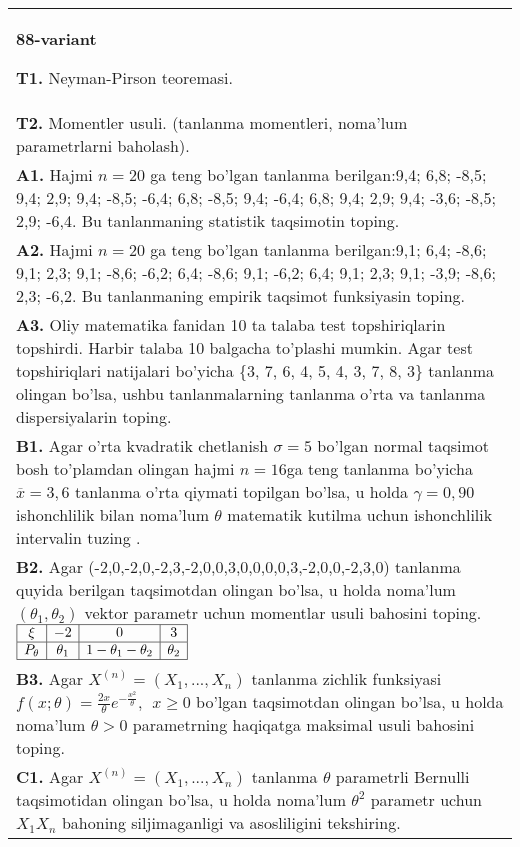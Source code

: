 \documentclass{article}
\begin{document}
\begin{tabular}{m{17cm}}
\textbf{88-variant}
\newline

\textbf{T1.} 
Neyman-Pirson teoremasi.
\\
\textbf{T2.} 
Momentler usuli. (tanlanma momentleri, noma'lum parametrlarni baholash).
\\
\textbf{A1.} 
Hajmi \(n = 20\) ga teng bo'lgan tanlanma berilgan:9,4; 6,8; -8,5; 9,4; 2,9; 9,4; -8,5; -6,4; 6,8; -8,5; 9,4; -6,4; 6,8; 9,4; 2,9; 9,4; -3,6; -8,5; 2,9; -6,4. Bu tanlanmaning statistik taqsimotin toping.
\\
\textbf{A2.} 
Hajmi \(n = 20\) ga teng bo'lgan tanlanma berilgan:9,1; 6,4; -8,6; 9,1; 2,3; 9,1; -8,6; -6,2; 6,4; -8,6; 9,1; -6,2; 6,4; 9,1; 2,3; 9,1; -3,9; -8,6; 2,3; -6,2. Bu tanlanmaning empirik taqsimot funksiyasin toping.
\\
\textbf{A3.} 
Oliy matematika fanidan 10 ta talaba test topshiriqlarin topshirdi. Harbir talaba 10 balgacha to'plashi mumkin. Agar test topshiriqlari natijalari bo'yicha \{3, 7, 6, 4, 5, 4, 3, 7, 8, 3\} tanlanma olingan bo'lsa, ushbu tanlanmalarning tanlanma o'rta va tanlanma dispersiyalarin toping.
\\
\textbf{B1.} 
Agar o'rta kvadratik chetlanish \(\sigma = 5\) bo'lgan normal taqsimot bosh to'plamdan olingan hajmi \(n = 16\)ga teng tanlanma bo'yicha \(\overline{x} = 3,6\) tanlanma o'rta qiymati topilgan bo'lsa, u holda \(\gamma = 0,90\) ishonchlilik bilan noma'lum \(\theta\) matematik kutilma uchun ishonchlilik intervalin tuzing .
\\
\textbf{B2.} 
Agar (-2,0,-2,0,-2,3,-2,0,0,3,0,0,0,0,3,-2,0,0,-2,3,0) tanlanma quyida berilgan taqsimotdan olingan bo'lsa, u holda noma'lum \(\left( \theta_{1},\theta_{2} \right)\) vektor parametr uchun momentlar usuli bahosini toping.
$\begin{array}{|c|c|c|c|}
    \hline
    \xi & - 2 & 0 & 3\\
    \hline
    P_{\theta} & \theta_{1} & 1 - \theta_{1} - \theta_{2} & \theta_{2} \\
    \hline
\end{array}$
\\
\textbf{B3.} 
Agar \(X^{(n)} = \left( X_{1},...,X_{n} \right)\) tanlanma zichlik funksiyasi \(f(x;\theta) = \frac{2x}{\theta}e^{- \frac{x^{2}}{\theta}},\ \ x \geq 0\) bo'lgan taqsimotdan olingan bo'lsa, u holda noma'lum \(\theta > 0\) parametrning haqiqatga maksimal usuli bahosini toping.
\\
\textbf{C1.} 
Agar \(X^{(n)} = \left( X_{1},...,X_{n} \right)\) tanlanma \(\theta\) parametrli Bernulli taqsimotidan olingan bo'lsa, u holda noma'lum \(\theta^{2}\) parametr uchun \(X_{1}X_{n}\) bahoning siljimaganligi va asosliligini tekshiring.

\end{tabular}
\end{document}
